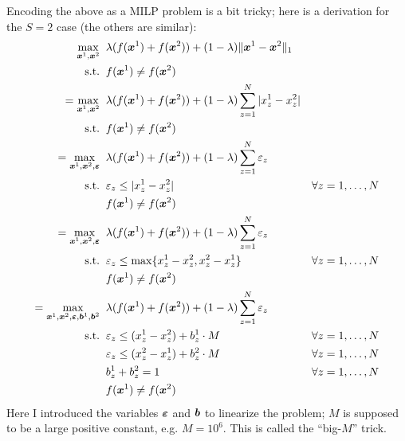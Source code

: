 \documentclass[12pt,a4paper]{article}
\begin{document}
\begin{itemize}
\begin{itemize}
                Encoding the above as a MILP problem is a bit tricky; here
                is a derivation for the $S=2$ case (the others are similar):
                \begin{align*}
                    \max_{\boldsymbol{x}^1, \boldsymbol{x}^2}
                        & \;\; \lambda (f(\boldsymbol{x}^1) + f(\boldsymbol{x}^2)) + (1 - \lambda) \|\boldsymbol{x}^1 - \boldsymbol{x}^2\|_1 \\
                    \text{s.t.}
                        & \;\; f(\boldsymbol{x}^1) \ne f(\boldsymbol{x}^2) \\
                    = \max_{\boldsymbol{x}^1, \boldsymbol{x}^2}
                        & \;\; \lambda (f(\boldsymbol{x}^1) + f(\boldsymbol{x}^2)) + (1 - \lambda) \sum_{z=1}^N |x^1_z - x^2_z| \\
                    \text{s.t.}
                        & \;\; f(\boldsymbol{x}^1) \ne f(\boldsymbol{x}^2) \\
                    = \max_{\boldsymbol{x}^1, \boldsymbol{x}^2, \boldsymbol{\varepsilon}}
                        & \;\; \lambda (f(\boldsymbol{x}^1) + f(\boldsymbol{x}^2)) + (1 - \lambda) \sum_{z=1}^N \varepsilon_z \\
                    \text{s.t.}
                        & \;\; \varepsilon_z \le |x^1_z - x^2_z|                            & \forall z = 1, \ldots, N \\
                        & \;\; f(\boldsymbol{x}^1) \ne f(\boldsymbol{x}^2) \\
                    = \max_{\boldsymbol{x}^1, \boldsymbol{x}^2, \boldsymbol{\varepsilon}}
                        & \;\; \lambda (f(\boldsymbol{x}^1) + f(\boldsymbol{x}^2)) + (1 - \lambda) \sum_{z=1}^N \varepsilon_z \\
                    \text{s.t.}
                        & \;\; \varepsilon_z \le \max \{ x^1_z - x^2_z, x^2_z - x^1_z \}    & \forall z = 1, \ldots, N \\
                        & \;\; f(\boldsymbol{x}^1) \ne f(\boldsymbol{x}^2) \\
                    = \max_{\boldsymbol{x}^1, \boldsymbol{x}^2, \boldsymbol{\varepsilon}, \boldsymbol{b}^1, \boldsymbol{b}^2}
                        & \;\; \lambda (f(\boldsymbol{x}^1) + f(\boldsymbol{x}^2)) + (1 - \lambda) \sum_{z=1}^N \varepsilon_z \\
                    \text{s.t.}
                        & \;\; \varepsilon_z \le (x^1_z - x^2_z) + b^1_z \cdot M            & \forall z = 1, \ldots, N \\
                        & \;\; \varepsilon_z \le (x^2_z - x^1_z) + b^2_z \cdot M            & \forall z = 1, \ldots, N \\
                        & \;\; b^1_z + b^2_z = 1                                            & \forall z = 1, \ldots, N \\
                        & \;\; f(\boldsymbol{x}^1) \ne f(\boldsymbol{x}^2)
                \end{align*}
                Here I introduced the variables $\boldsymbol{\varepsilon}$ and $\boldsymbol{b}$ to
                linearize the problem; $M$ is supposed to be a large positive
                constant, e.g. $M = 10^6$. This is called the ``big-$M$''
                trick.


\end{itemize}
\end{itemize}
\end{document}
